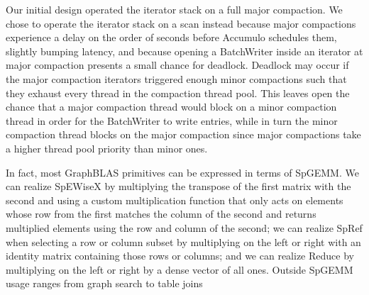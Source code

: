 


Our initial design operated the iterator stack on a full major compaction.
We chose to operate the iterator stack on a scan instead because major compactions experience
a delay on the order of seconds before Accumulo schedules them, slightly bumping latency,
and because opening a BatchWriter inside an iterator at major compaction presents a small chance for deadlock.
Deadlock may occur if the major compaction iterators triggered enough minor compactions 
such that they exhaust every thread in the compaction thread pool.
This leaves open the chance that a major compaction thread would block on a minor compaction thread
in order for the BatchWriter to write entries, while in turn the minor compaction thread blocks on 
the major compaction since major compactions take a higher thread pool priority than minor ones.




In fact, most GraphBLAS primitives can be expressed in terms of SpGEMM.
We can realize SpEWiseX by multiplying the transpose of the first matrix with the second
and using a custom multiplication function that only acts on elements whose row from the first 
matches the column of the second and returns multiplied elements using the row and column of the second;
we can realize SpRef when selecting a row or column subset by multiplying on the left or right with an identity matrix
containing those rows or columns;
and we can realize Reduce by multiplying on the left or right %
by a dense vector of all ones.
Outside SpGEMM usage ranges from graph search \cite{kepner2011graph} to table joins \cite{cohen2009mad} 



